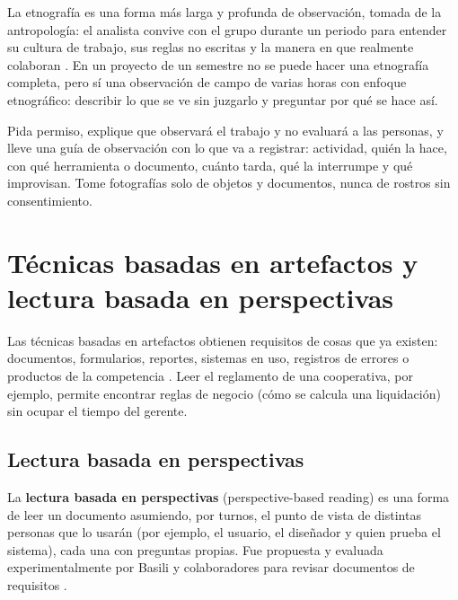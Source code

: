 \documentclass[11pt,a4paper,oneside]{report}
\begin{document}
La etnografía es una forma más larga y profunda de observación, tomada de la antropología: el analista convive con el grupo durante un periodo para entender su cultura de trabajo, sus reglas no escritas y la manera en que realmente colaboran \citep{zowghi_coulin_2005}. En un proyecto de un semestre no se puede hacer una etnografía completa, pero sí una observación de campo de varias horas con enfoque etnográfico: describir lo que se ve sin juzgarlo y preguntar por qué se hace así.

\begin{enlapractica}
	Pida permiso, explique que observará el trabajo y no evaluará a las personas, y lleve una guía de observación con lo que va a registrar: actividad, quién la hace, con qué herramienta o documento, cuánto tarda, qué la interrumpe y qué improvisan. Tome fotografías solo de objetos y documentos, nunca de rostros sin consentimiento.
\end{enlapractica}

\section{Técnicas basadas en artefactos y lectura basada en perspectivas}\label{sec:artefactos}

Las técnicas basadas en artefactos obtienen requisitos de cosas que ya existen: documentos, formularios, reportes, sistemas en uso, registros de errores o productos de la competencia \citep{ireb_cpre_fl_2026,swebok_v4_2024}. Leer el reglamento de una cooperativa, por ejemplo, permite encontrar reglas de negocio (cómo se calcula una liquidación) sin ocupar el tiempo del gerente.

\subsection{Lectura basada en perspectivas}

\begin{definicion}
	La \textbf{lectura basada en perspectivas} (perspective-based reading) es una forma de leer un documento asumiendo, por turnos, el punto de vista de distintas personas que lo usarán (por ejemplo, el usuario, el diseñador y quien prueba el sistema), cada una con preguntas propias. Fue propuesta y evaluada experimentalmente por Basili y colaboradores para revisar documentos de requisitos \citep{basili_1996}.
\end{definicion}
\end{document}
